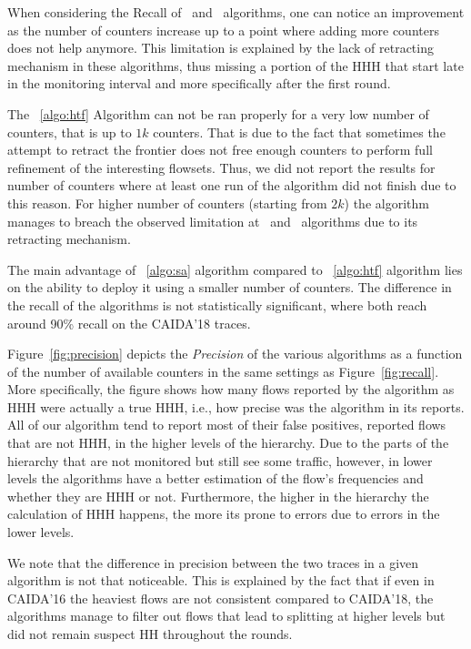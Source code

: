 When considering the Recall of ~\simpleAlgo  and ~\multipleAlgo  algorithms, one can notice an improvement as the number of counters increase up to a point where adding more counters does not help anymore. This limitation is explained by the lack of retracting mechanism in these algorithms, thus missing a portion of the HHH that start late in the monitoring interval and more specifically after the first round.

The ~\ref{algo:htf} Algorithm can not be ran properly for a very low number of counters, that is up to $1k$ counters. That is due to the fact that sometimes the attempt to retract the frontier does not free enough counters to perform full refinement of the interesting flowsets. Thus, we did not report the results for number of counters where at least one run of the algorithm did not finish due to this reason. For higher number of counters (starting from $2k$) the algorithm manages to breach the observed limitation at ~\simpleAlgo and ~\multipleAlgo algorithms due to its retracting mechanism.

The main advantage of ~\ref{algo:sa} algorithm compared to ~\ref{algo:htf} algorithm lies on the ability to deploy it using a smaller number of counters. The difference in the recall of the algorithms is not statistically significant, where both reach around 90\% recall on the CAIDA'18 traces.



Figure~\ref{fig:precision} depicts the \textit{Precision} of the various algorithms as a function of the number of available counters in the same settings as Figure~\ref{fig:recall}. More specifically, the figure shows how many flows reported by the algorithm as HHH were actually a true HHH, i.e., how precise was the algorithm in its reports. All of our algorithm tend to report most of their false positives, reported flows that are not HHH, in the higher levels of the hierarchy. Due to the parts of the hierarchy that are not monitored but still see some traffic, however, in lower levels the algorithms have a better estimation of the flow's frequencies and whether they are HHH or not. Furthermore, the higher in the hierarchy the calculation of HHH happens, the more its prone to errors due to errors in the lower levels.

We note that the difference in precision between the two traces in a given algorithm is not that noticeable. This is explained by the fact that if even in CAIDA'16 the heaviest flows are not consistent compared to CAIDA'18, the algorithms manage to filter out flows that lead to splitting at higher levels but did not remain suspect HH throughout the rounds.

